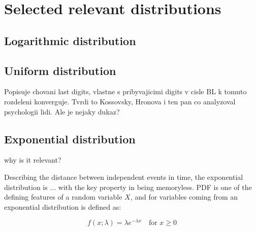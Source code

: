 


\section{Selected relevant distributions}

\subsection{Logarithmic distribution}

\subsection{Uniform distribution}

\begin{koment}
    Popisuje chovani last digits, vlastne s pribyvajicimi digits v cisle BL k tomuto rozdeleni konverguje. Tvrdi to Kossovsky, Hronova i ten pan co analyzoval psychologii lidi. Ale je nejaky dukaz? 
\end{koment}

\newpage

\subsection{Exponential distribution}

\begin{koment}
    why is it relevant? 
\end{koment}

Describing the distance between independent events in time, the exponential distribution is \textcolor{blue}{...} with the key property in being memoryless. PDF is one of the defining features of a random variable $X$, and for variables coming from an exponential distribution is defined as: 

\begin{equation}
    f(x;\lambda) = \lambda e^{-\lambda x} \quad \text{for } x \ge 0 
\end{equation}

